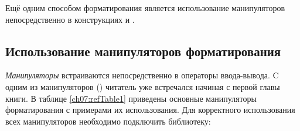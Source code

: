 Ещё одним способом форматирования является использование манипуляторов непосредственно в конструкциях
 и .

\subsection[Использование манипуляторов форматирования]{Использование манипуляторов форматирования}
\label{ch07:1.2}

\emph{Манипуляторы} встраиваются непосредственно в операторы
ввода-вывода. C одним из манипуляторов () читатель уже встречался 
начиная с первой главы книги.
В таблице \ref{ch07:refTable1} приведены основные манипуляторы форматирования с примерами их использования. Для
корректного использования всех манипуляторов необходимо подключить библиотеку:


